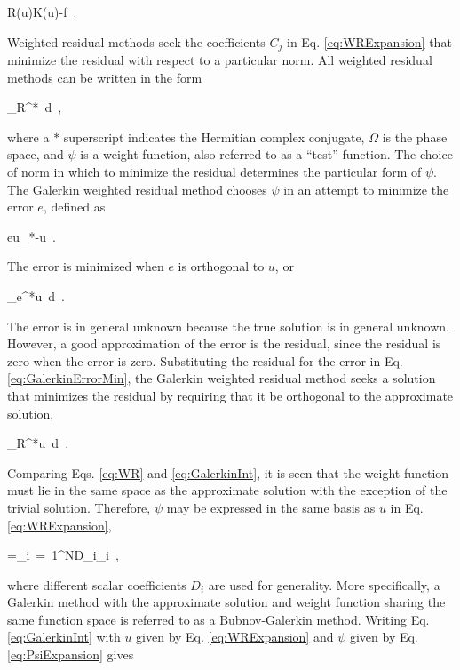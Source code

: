 \beq
\label{eq:residual}
R(u)\equiv K(u)-f\ .
\eeq

\noindent Weighted residual methods seek the coefficients \(C_j\) in Eq. \eqref{eq:WRExpansion} that minimize the residual with respect to a particular norm. All weighted residual methods can be written in the form

\beq
\label{eq:WR}
\int_\Omega R^*\psi\ d\ ,
\eeq

\noindent where a \(*\) superscript indicates the Hermitian complex conjugate, \(\Omega\) is the phase space, and \(\psi\) is a weight function, also referred to as a ``test'' function. The choice of norm in which to minimize the residual determines the particular form of \(\psi\). The Galerkin weighted residual method chooses \(\psi\) in an attempt to minimize the error \(e\), defined as

\beq
\label{eq:error123}
e\equiv u_*-u\ .
\eeq

\noindent The error is minimized when \(e\) is orthogonal to \(u\), or

\beq
\label{eq:GalerkinErrorMin}
\int_{\Omega}e^*u\ d\ .
\eeq

\noindent The error is in general unknown because the true solution is in general unknown. However, a good approximation of the error is the residual, since the residual is zero when the error is zero. Substituting the residual for the error in Eq. \eqref{eq:GalerkinErrorMin}, the Galerkin weighted residual method seeks a solution that minimizes the residual by requiring that it be orthogonal to the approximate solution,

\beq
\label{eq:GalerkinInt}
\int_{\Omega}R^*u\ d\ .
\eeq

\noindent Comparing Eqs. \eqref{eq:WR} and \eqref{eq:GalerkinInt}, it is seen that the weight function must lie in the same space as the approximate solution with the exception of the trivial solution. Therefore, \(\psi\) may be expressed in the same basis as \(u\) in Eq. \eqref{eq:WRExpansion},

\beq
\label{eq:PsiExpansion}
\psi=\sum_{i\ =\ 1}^ND_i\phi_i\ ,
\eeq

\noindent where different scalar coefficients \(D_i\) are used for generality. More specifically, a Galerkin method with the approximate solution and weight function sharing the same function space is referred to as a Bubnov-Galerkin method. Writing Eq. \eqref{eq:GalerkinInt} with \(u\) given by Eq. \eqref{eq:WRExpansion} and \(\psi\) given by Eq. \eqref{eq:PsiExpansion} gives

